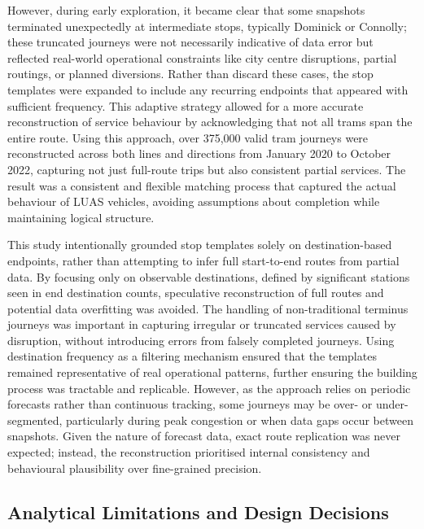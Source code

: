     However, during early exploration, it became clear that some snapshots terminated unexpectedly at intermediate stops, typically Dominick or Connolly; these truncated journeys were not necessarily indicative of data error but reflected real-world operational constraints like city centre disruptions, partial routings, or planned diversions. Rather than discard these cases, the stop templates were expanded to include any recurring endpoints that appeared with sufficient frequency. This adaptive strategy allowed for a more accurate reconstruction of service behaviour by acknowledging that not all trams span the entire route.  Using this approach, over 375,000 valid tram journeys were reconstructed across both lines and directions from January 2020 to October 2022, capturing not just full-route trips but also consistent partial services. The result was a consistent and flexible matching process that captured the actual behaviour of LUAS vehicles, avoiding assumptions about completion while maintaining logical structure.
    
    This study intentionally grounded stop templates solely on destination-based endpoints, rather than attempting to infer full start-to-end routes from partial data. By focusing only on observable destinations, defined by significant stations seen in end destination counts, speculative reconstruction of full routes and potential data overfitting was avoided. The handling of non-traditional terminus journeys was important in capturing irregular or truncated services caused by disruption, without introducing errors from falsely completed journeys. Using destination frequency as a filtering mechanism ensured that the templates remained representative of real operational patterns, further ensuring the building process was tractable and replicable. However, as the approach relies on periodic forecasts rather than continuous tracking, some journeys may be over- or under-segmented, particularly during peak congestion or when data gaps occur between snapshots. Given the nature of forecast data, exact route replication was never expected; instead, the reconstruction prioritised internal consistency and behavioural plausibility over fine-grained precision.



\subsection*{Analytical Limitations and Design Decisions}

